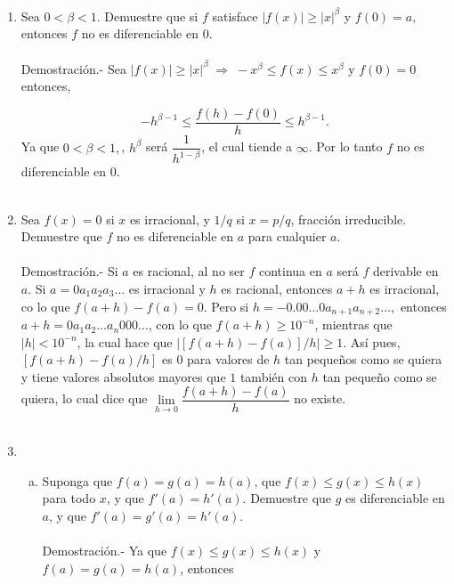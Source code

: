 \begin{enumerate}[\bfseries 1]
    \item Sea $0<\beta<1.$ Demuestre que si $f$ satisface $|f(x)|\geq |x|^{\beta}$ y $f(0)=a,$ entonces $f$ no es diferenciable en $0$.\\\\
	Demostración.-\; Sea $|f(x)|\geq |x|^\beta\;\Rightarrow \; -x^\beta\leq f(x)\leq x^\beta$ y $f(0)=0$ entonces,

	$$-h^{\beta-1}\leq \dfrac{f(h)-f(0)}{h}\leq h^{\beta-1}.$$
	Ya que $0<\beta < 1,$, $h^\beta$ será $\dfrac{1}{h^{1-\beta}}$, el cual tiende a $\infty$. Por lo tanto $f$ no es diferenciable en $0$.\\\\

    \item Sea $f(x)=0$ si $x$ es irracional, y $1/q$ si $x=p/q$, fracción irreducible. Demuestre que $f$ no es diferenciable en $a$ para cualquier $a$.\\\\
	Demostración.-\; Si $a$ es racional, al no ser $f$ continua en $a$ será $f$ derivable en $a$. Si $a=0 a_1a_2a_3\ldots$ es irracional y $h$ es racional, entonces $a+h$ es irracional, co lo que $f(a+h)-f(a)=0$. Pero si $h = -0.00\ldots 0 a_{n+1}a_{n+2}\ldots,$ entonces $a+h=0a_1a_2\ldots a_n 000 \ldots$, con lo que $f(a+h)\geq 10^{-n}$, mientras que $|h|<10^{-n}$, la cual hace que $|[f(a+h)-f(a)]/h|\geq 1$. Así pues, $[f(a+h)-f(a)/h]$ es $0$ para valores de $h$ tan  pequeños como se quiera y tiene valores absolutos mayores que $1$ también con $h$ tan pequeño como se quiera, lo cual dice que $\lim\limits_{h\to 0}\dfrac{f(a+h)-f(a)}{h}$ no existe.\\\\

    \item 
	\begin{enumerate}[(a)]

	    \item Suponga que $f(a)=g(a)=h(a)$, que $f(x)\leq g(x)\leq h(x)$ para todo $x$, y que $f'(a)=h'(a)$. Demuestre que $g$ es diferenciable en $a$, y que $f'(a)=g'(a)=h'(a)$.\\\\
		Demostración.-\; Ya que $f(x)\leq g(x)\leq h(x)$ y $f(a)=g(a)=h(a)$, entonces


\end{enumerate}
\end{enumerate}
